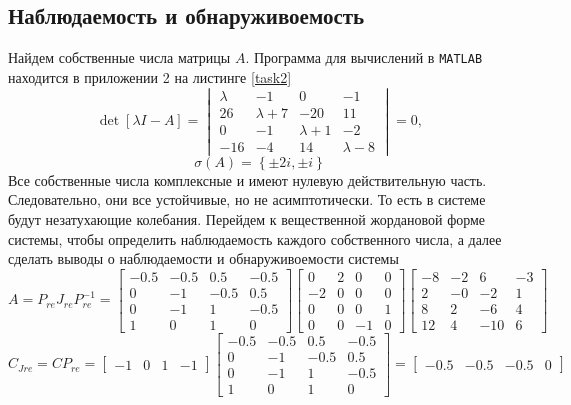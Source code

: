\documentclass[a4paper, 12pt]{article}
\begin{document}
    \subsection{Наблюдаемость и обнаруживоемость}
    Найдем собственные числа матрицы $A$.
    Программа для вычислений в \texttt{MATLAB} находится в приложении
    2 на листинге \ref{task2}
    $$
    \det{\left[\lambda I-A\right]}=\begin{vmatrix}
        \lambda &-1 &0 &-1\\
        26 &\lambda+7 &-20 &11\\
        0 &-1 &\lambda+1 &-2\\
        -16 &-4 &14 &\lambda-8
    \end{vmatrix}=0,
    $$
    $$
    \sigma\left(A\right)=\left\{\pm2i,\pm i\right\}
    $$
    Все собственные числа комплексные и имеют нулевую действительную часть.
    Следовательно, они все устойчивые, но не асимптотически. То есть в системе будут незатухающие колебания.
    Перейдем к вещественной жордановой форме системы, чтобы определить наблюдаемость каждого собственного числа,
    а далее сделать выводы о наблюдаемости и обнаруживоемости системы
    $$
    A=P_{re}J_{re}P_{re}^{-1}=\begin{bmatrix}
    -0.5 &-0.5    &0.5   &-0.5\\
    0   &-1   &-0.5    &0.5\\
    0   &-1    &1   &-0.5\\
    1   &0    &1    &0
    \end{bmatrix}\begin{bmatrix}
    0    &2   &0    &0\\
   -2   &0    &0   &0\\
    0   &0    &0    &1\\
   0   &0   &-1   &0
    \end{bmatrix}\begin{bmatrix}
    -8   &-2    &6   &-3\\
    2   &-0   &-2    &1\\
    8    &2   &-6    &4\\
   12    &4  &-10    &6
    \end{bmatrix}
    $$
    $$
    C_{Jre}=CP_{re}=\begin{bmatrix}
        -1 &0 &1 &-1
    \end{bmatrix}\begin{bmatrix}
        -0.5 &-0.5    &0.5   &-0.5\\
        0   &-1   &-0.5    &0.5\\
        0   &-1    &1   &-0.5\\
        1   &0    &1    &0
    \end{bmatrix}=\begin{bmatrix}
        -0.5   &-0.5   &-0.5         &0
    \end{bmatrix}
    $$
\end{document}
